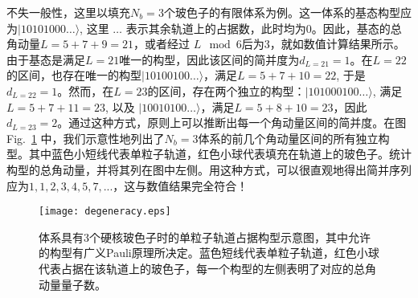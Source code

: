 不失一般性，这里以填充$N_b = 3$个玻色子的有限体系为例。这一体系的基态构型应为$|10101000 \ldots \rangle$, 这里 $\ldots$ 表示其余轨道上的占据数，此时均为0。因此，基态的总角动量$L = 5 + 7 + 9 = 21$，或者经过 $L \mod 6$后为3，就如数值计算结果所示。由于基态是满足$L=21$唯一的构型，因此该区间的简并度为$d_{L=21}=1$。在$L=22$的区间，也存在唯一的构型$|10100100 \ldots \rangle$，满足$L=5+7+10 =
22$, 于是$d_{L=22}=1$。然而，在$L=23$的区间，存在两个独立的构型：$|101000100 \ldots \rangle$, 满足 $L=5+7+11 = 23$, 以及 $|10010100 \ldots \rangle$，满足$L=5+8+10 = 23$，因此$d_{L=23}=2$。通过这种方式，原则上可以推断出每一个角动量区间的简并度。在图Fig.~\ref{fig:degeneracycount} 中，我们示意性地列出了$N_b=3$体系的前几个角动量区间的所有独立构型。其中蓝色小短线代表单粒子轨道，红色小球代表填充在轨道上的玻色子。统计构型的总角动量，并将其列在图中左侧。用这种方式，可以很直观地得出简并序列应为$1,1,2,3,4,5,7, ...$，这与数值结果完全符合！

\begin{figure}[!htb]
    \centering
    \texttt{[image: degeneracy.eps]}
    \caption{体系具有3个硬核玻色子时的单粒子轨道占据构型示意图，其中允许的构型有广义Pauli原理所决定。蓝色短线代表单粒子轨道，红色小球代表占据在该轨道上的玻色子，每一个构型的左侧表明了对应的总角动量量子数。}
\label{fig:degeneracycount}
\end{figure}